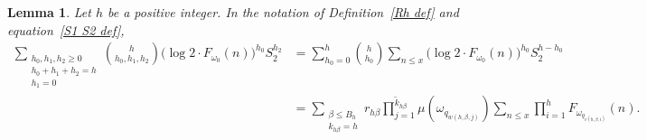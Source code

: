 \documentclass[12pt,reqno]{amsart}
\newtheorem{lemma}[theorem]{Lemma}
\theoremstyle{definition}
\begin{document}
\begin{lemma}\label{matching main terms lemma}
Let $h$ be a positive integer. In the notation of Definition~\ref{Rh def} and equation~\eqref{S1 S2 def},
\begin{align*}
\sum_{\substack{h_0,h_1,h_2\ge0 \\ h_0+h_1+h_2=h \\ h_1=0}} \binom h{h_0,h_1,h_2} \big( \log 2 \cdot F_{\omega_0}(n) \big)^{h_0} S_2^{h_2}  &= \sum_{h_0=0}^h \binom h{h_0} \sum_{n \leq x} \big( \log 2 \cdot F_{\omega_0}(n) \big)^{h_0} S_2^{h-h_0} \\
&=
\sum_{\substack{\beta\le B_h \\ k_{h\beta}=h}} r_{h\beta} \prod_{j=1}^{\tilde k_{h\beta}} \mu(\omega_{q_{w(h,\beta, j)}}) \sum_{n \leq x} \prod_{i=1}^h F_{\omega_{q_{v(h,\beta, i)}}}(n).
\end{align*} 
\end{lemma}
\end{document}
